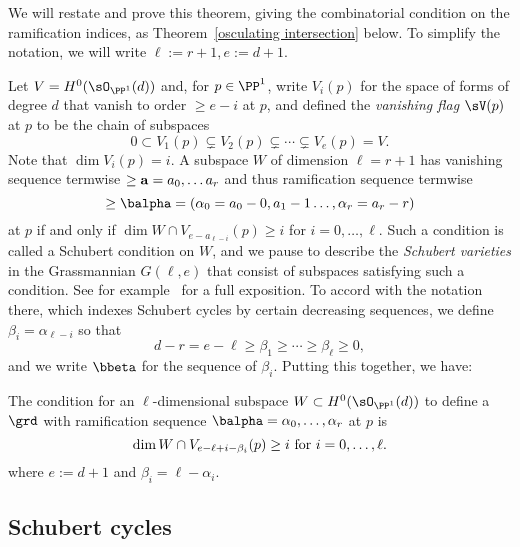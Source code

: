 We will restate and prove this theorem, giving the combinatorial condition on the ramification indices,
as Theorem~\ref{osculating intersection} below. To simplify the notation, we will write $\ell := r+1, e:= d+1$. 


Let $V =H^{0}(\sO_{\PP^{1}}(d))$ and, for $p\in \PP^{1}$, write $V_{i}(p)$ for the space of
forms of degree $d$ that vanish to order $\geq e-i$ at $p$, and defined the \emph{vanishing flag} $\sV(p)$ at $p$
to be the chain of subspaces
$$
0\subset V_{1}(p) \subsetneq V_{2}(p) \subsetneq\cdots\subsetneq V_{e}(p) = V.
$$
Note that $\dim V_{i}(p) = i$.
A subspace $W$ of dimension $\ell = r+1$ has vanishing sequence termwise $\geq {\bf a} = a_{0}, \dots a_{r}$ and thus
ramification sequence termwise
$$
\geq \balpha = (\alpha_{0} = a_{0}-0, a_{1}-1 \dots, \alpha_{r}= a_{r}-r)
$$
 at $p$ if and only if
$\dim W\cap V_{e-a_{\ell-i}}(p)\geq  i$  for  $i = 0,\dots, \ell$.
Such a condition is called a Schubert condition
on $W$, and we pause to describe the \emph{Schubert varieties} in
the Grassmannian $G(\ell, e)$ that consist
of subspaces satisfying such a condition. See for example~\cite[Chapters 3 and 4]{3264} for a full exposition.
To accord with the notation there, which indexes Schubert cycles by certain decreasing sequences,
we define $\beta_{i} = \alpha_{\ell-i}$ so that
$$
d-r = e-\ell \geq \beta_{1} \geq \cdots \geq \beta_{\ell}\geq 0,
$$
and we write $\bbeta$ for the sequence of $\beta_{i}$. Putting this together, we have:
\begin{proposition}\label{ramification}
The condition for an $\ell$-dimensional subspace $W \subset H^{0}(\sO_{\PP^{1}}(d))$
to define a $\grd$ with ramification sequence $\balpha = \alpha_{0},\dots, \alpha_{r}$ at $p$ is
$$
\dim W\cap V_{e-\ell+i-\beta_{i}}(p)\geq  i \hbox{ for } i = 0,\dots, \ell.
$$
where $e:=d+1$ and $\beta_{i} = \ell-\alpha_{i}$.
\end{proposition}



\subsection{Schubert cycles}\label{Schubert1}

